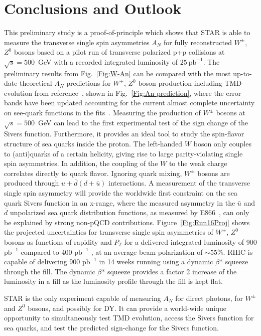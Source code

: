 \documentclass[12pt]{article}
\begin{document}
\section{Conclusions and Outlook}
This preliminary study is a proof-of-principle which shows that STAR is able to measure the transverse single spin asymmetries $A_{N}$ for fully reconstructed $W^{\pm}$, $Z^{0}$ bosons based on a pilot run of transverse polarized p+p collisions at $\sqrt{s}=500$~GeV with a recorded integrated luminosity of $25~\text{pb}^{-1}$. 
The preliminary results from Fig.~\ref{Fig:W-An} can be compared with the most up-to-date theoretical $A_{N}$ predictions for $W^{\pm}$, $Z^{0}$ boson production including TMD-evolution from reference~\cite{Kang:2014}, shown in Fig.~\ref{Fig:An-prediction}, where the error bands have been updated accounting for the current almost complete uncertainty on see-quark functions in the fits~\cite{Kang:private}.
Measuring the production of $W^{\pm}$ bosons at $\sqrt{s}=500$~GeV can lead to the first experimental test of the sign change of the Sivers function. Furthermore, it provides an ideal tool to study the spin-flavor structure of sea quarks inside the proton. The left-handed $W$ boson only couples to (anti)quarks of a certain helicity, giving rise to large parity-violating single spin asymmetries. In addition, the coupling of the $W$ to the weak charge correlates directly to quark flavor. Ignoring quark mixing, $W^{\pm}$ bosons are produced through $u+\bar d (d + \bar u)$ interactions. A measurement of the transverse single spin asymmetry will provide the worldwide first constraint on the sea quark Sivers function in an x-range, where the measured asymmetry in the  $\bar u$ and $\bar d$ unpolarized sea quark distribution functions, as measured by E866~\cite{E866}, can only be explained by strong non-pQCD contributions. Figure~\ref{Fig:Run16Proj} shows the projected uncertainties for transverse single spin asymmetries of $W^{\pm}$, $Z^{0}$ bosons as functions of rapidity and $P_{T}$ for a delivered integrated luminosity of 900 $\text{pb}^{-1}$ compared to 400 $\text{pb}^{-1}$ , at an average beam polarization of $\sim55\%$. RHIC is capable of delivering 900 $\text{pb}^{-1}$ in 14 weeks running using a dynamic $\beta$* squeeze~\cite{beta_squeeze} through the fill. The dynamic $\beta$* squeeze provides a factor 2 increase of the luminosity in a fill as the luminosity profile through the fill is kept flat.

STAR is the only experiment capable of measuring $A_{N}$ for direct photons, for $W^{\pm}$ and $Z^{0}$ bosons, and possibly for DY. It can provide a world-wide unique opportunity to simultaneously test TMD evolution, access the Sivers function for sea quarks, and test the predicted sign-change for the Sivers function.
\end{document}
